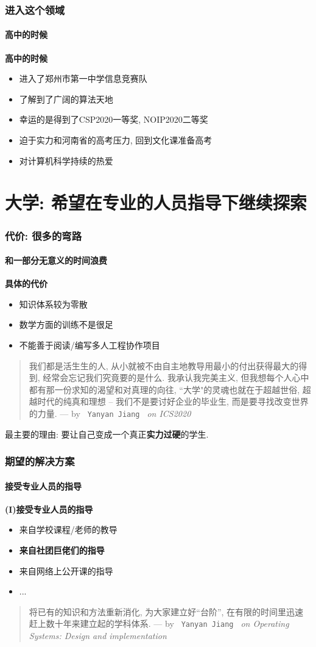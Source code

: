 \documentclass[11pt]{beamer}
\begin{document}
	\begin{frame}
		\frametitle{进入这个领域}
		\framesubtitle{高中的时候}
		\textbf{高中的时候}
		\begin{itemize}
			\item 进入了郑州市第一中学信息竞赛队
			\item 了解到了广阔的算法天地
			\item 幸运的是得到了CSP2020一等奖, NOIP2020二等奖
			\item 迫于实力和河南省的高考压力, 回到文化课准备高考
			\item 对计算机科学持续的热爱
		\end{itemize} 
	\end{frame}

	\section{大学: 希望在专业的人员指导下继续探索}
	\begin{frame}
		\frametitle{代价: 很多的弯路}
		\framesubtitle{和一部分无意义的时间浪费}
		
		\textbf{具体的代价}
		\begin{itemize}
			\item 知识体系较为零散
			\item 数学方面的训练不是很足
			\item 不能善于阅读/编写多人工程协作项目
		\end{itemize}
		
		\begin{quote}
			我们都是活生生的人, 从小就被不由自主地教导用最小的付出获得最大的得到, 经常会忘记我们究竟要的是什么. 我承认我完美主义, 但我想每个人心中都有那一份求知的渴望和对真理的向往, ``大学"的灵魂也就在于超越世俗, 超越时代的纯真和理想 -- 我们不是要讨好企业的毕业生, 而是要寻找改变世界的力量.  --- by  \texttt{ Yanyan Jiang } \textit{on ICS2020}
		\end{quote}
		\begin{centering}
		最主要的理由: 要让自己变成一个真正\textbf{实力过硬}的学生.
		\end{centering}
	\end{frame}

	\begin{frame}
		\frametitle{期望的解决方案}
		\framesubtitle{接受专业人员的指导}
		\pause
		\textbf{(I)接受专业人员的指导}
		
		\begin{itemize}
			\item 来自学校课程/老师的教导
			\item \textbf{来自社团巨佬们的指导}
			\item 来自网络上公开课的指导
			\item ...
		\end{itemize}
		
		
		\begin{quote}
			将已有的知识和方法重新消化, 为大家建立好``台阶'', 在有限的时间里迅速赶上数十年来建立起的学科体系.  --- by  \texttt{ Yanyan Jiang } \textit{on Operating Systems: Design and implementation}
		\end{quote}
	
	
	\end{frame}
\end{document}
